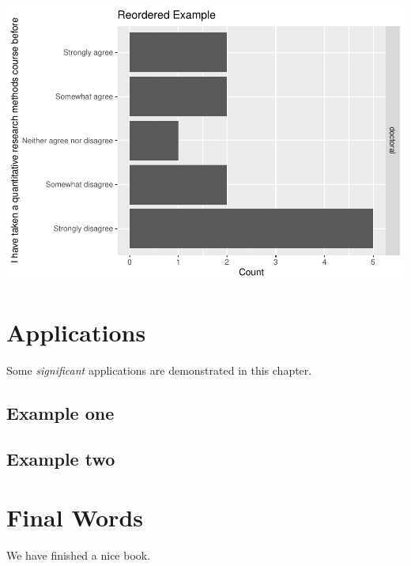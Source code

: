 \documentclass[
]{book}
\begin{document}
\includegraphics{test_course_notes_files/figure-latex/unnamed-chunk-36-1.pdf}

\hypertarget{applications}{%
\chapter{Applications}\label{applications}}

Some \emph{significant} applications are demonstrated in this chapter.

\hypertarget{example-one}{%
\section{Example one}\label{example-one}}

\hypertarget{example-two}{%
\section{Example two}\label{example-two}}

\hypertarget{final-words}{%
\chapter{Final Words}\label{final-words}}

We have finished a nice book.

  
\end{document}
